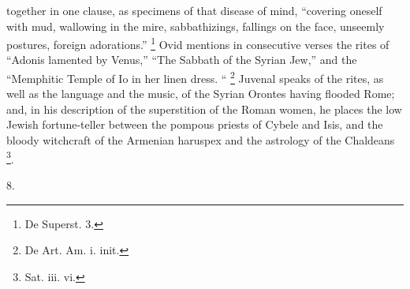 together in one clause, as specimens of that disease of
mind, ``covering oneself with mud, wallowing in the
mire, sabbathizings, fallings on the face, unseemly
postures, foreign adorations.'' \footnote{De Superst. 3.} Ovid mentions in consecutive
verses the rites of ``Adonis lamented by Venus,''
``The Sabbath of the Syrian Jew,'' and the
``Memphitic Temple of Io in her linen dress. `` \footnote{De Art. Am. i. init.} Juvenal speaks of the rites, as well as the language and the
music, of the Syrian Orontes having flooded Rome; and, in
his description of the superstition of the Roman women,
he places the low Jewish fortune-teller between the pompous priests of Cybele and Isis, and the bloody
witchcraft of the Armenian haruspex and the astrology of
the Chaldeans \footnote{Sat. iii. vi.}.

8.

